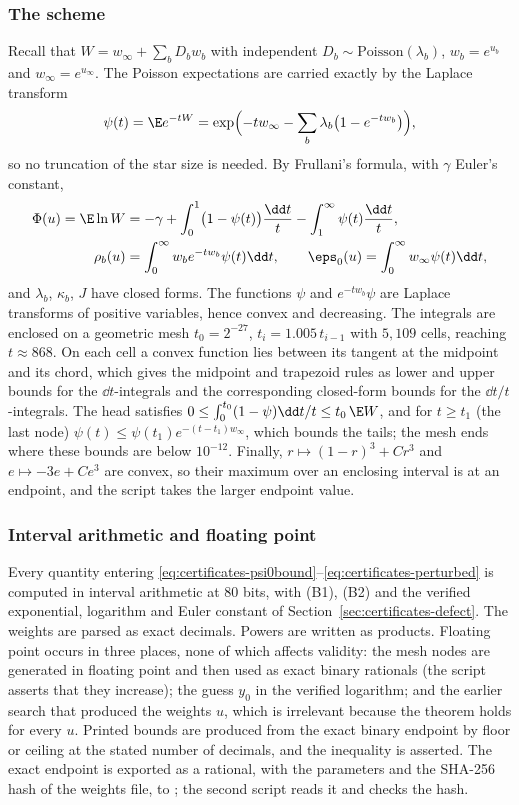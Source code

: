 \subsubsection*{The scheme}
Recall that $W=w_\infty+\sum_bD_bw_b$ with independent $D_b\sim\mathrm{Poisson}(\lambda_b)$,
$w_b=e^{u_b}$ and $w_\infty=e^{u_\infty}$. The Poisson expectations are carried exactly by the
Laplace transform
\[
\psi(t)=\E e^{-tW}=\exp\Bigl(-tw_\infty-\sum_b\lambda_b\bigl(1-e^{-tw_b}\bigr)\Bigr),
\]
so no truncation of the star size is needed. By Frullani's formula, with $\gamma$ Euler's
constant,
\begin{align*}
\Phi(u)=\E\ln W&=-\gamma+\int_0^1\bigl(1-\psi(t)\bigr)\frac{\dd t}{t}
-\int_1^\infty\psi(t)\frac{\dd t}{t},\\
\rho_b(u)&=\int_0^\infty w_be^{-tw_b}\psi(t)\dd t,\qquad
\eps_0(u)=\int_0^\infty w_\infty\psi(t)\dd t,
\end{align*}
and $\lambda_b$, $\kappa_b$, $J$ have closed forms. The functions $\psi$ and
$e^{-tw_b}\psi$ are Laplace transforms of positive variables, hence convex and decreasing.
The integrals are enclosed on a geometric mesh $t_0=2^{-27}$, $t_i=1.005\,t_{i-1}$ with
$5{,}109$ cells, reaching $t\approx868$. On each cell a convex function lies between its
tangent at the midpoint and its chord, which gives the midpoint and trapezoid rules as lower
and upper bounds for the $\dd t$-integrals and the corresponding closed-form bounds for the
$\dd t/t$-integrals. The head satisfies $0\le\int_0^{t_0}(1-\psi)\dd t/t\le t_0\,\E W$, and
for $t\ge t_1$ (the last node) $\psi(t)\le\psi(t_1)e^{-(t-t_1)w_\infty}$, which bounds the
tails; the mesh ends where these bounds are below $10^{-12}$. Finally,
$r\mapsto(1-r)^3+Cr^3$ and $e\mapsto-3e+Ce^3$ are convex, so their maximum over an enclosing
interval is at an endpoint, and the script takes the larger endpoint value.

\subsubsection*{Interval arithmetic and floating point}
Every quantity entering \eqref{eq:certificates-psi0bound}--\eqref{eq:certificates-perturbed}
is computed in interval arithmetic at $80$ bits, with (B1), (B2) and the verified
exponential, logarithm and Euler constant of Section~\ref{sec:certificates-defect}. The
weights are parsed as exact decimals. Powers are written as products. Floating point occurs in
three places, none of which affects validity: the mesh nodes are generated in floating point
and then used as exact binary rationals (the script asserts that they increase); the guess
$y_0$ in the verified logarithm; and the earlier search that produced the weights $u$, which
is irrelevant because the theorem holds for every $u$. Printed bounds are produced from the
exact binary endpoint by floor or ceiling at the stated number of decimals, and the
inequality is asserted. The exact endpoint is exported as a rational, with the parameters and
the SHA-256 hash of the weights file, to ; the second script
reads it and checks the hash.

